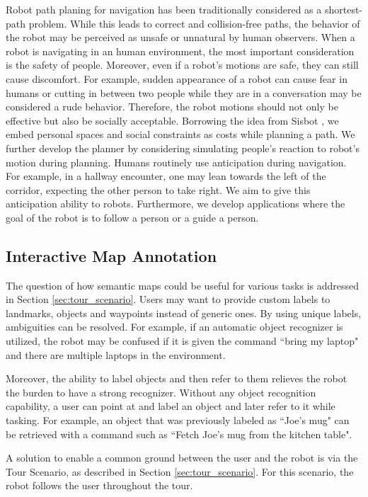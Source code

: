 \documentclass[12pt]{gatech-thesis}
\begin{document}
Robot path planing for navigation has been traditionally considered as a shortest-path problem. While this leads to correct and collision-free paths, the behavior of the robot may be perceived as unsafe or unnatural by human observers. When a robot is navigating in an human environment, the most important consideration is the safety of people. Moreover, even if a robot's motions are safe, they can still cause discomfort. For example, sudden appearance of a robot can cause fear in humans or cutting in between two people while they are in a conversation may be considered a rude behavior. Therefore, the robot motions should not only be effective but also be socially acceptable.
Borrowing the idea from Sisbot \cite{sisbot2007human}, we embed personal spaces and social constraints as costs while planning a path. We further develop the planner by considering simulating people's reaction to robot's motion during planning. Humans routinely use anticipation during navigation. For example, in a hallway encounter, one may lean towards the left of the corridor, expecting the other person to take right. We aim to give this anticipation ability to robots. Furthermore, we develop applications where the goal of the robot is to follow a person or a guide a person.

\subsection{Interactive Map Annotation}

The question of how semantic maps could be useful for various tasks is addressed in Section \ref{sec:tour_scenario}. Users may want to provide custom labels to landmarks, objects and waypoints instead of generic ones. By using unique labels, ambiguities can be resolved. For example, if an automatic object recognizer is utilized, the robot may be confused if it is given the command ``bring my laptop" and there are multiple laptops in the environment.

Moreover, the ability to label objects and then refer to them relieves the robot the burden to have a strong recognizer. Without any object recognition capability, a user can point at and label an object and later refer to it while tasking. For example, an object that was previously labeled as ``Joe's mug" can be retrieved with a command such as ``Fetch Joe's mug from the kitchen table".

A solution to enable a common ground between the user and the robot is via the Tour Scenario, as described in Section \ref{sec:tour_scenario}. For this scenario, the robot follows the user throughout the tour.
\end{document}
